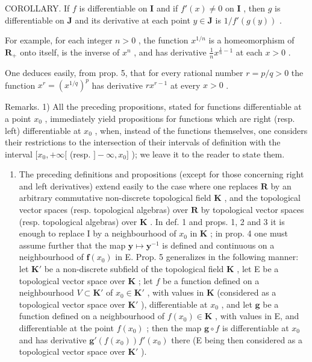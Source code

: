 COROLLARY. If \(f\) is differentiable on \(\mathbf{I}\) and if \(f'(x) \neq 0\) on \(\mathbf{I}\) , then \(g\) is differentiable on \(\mathbf{J}\) and its derivative at each point \(y \in \mathbf{J}\) is \(1 / f'(g(y))\) .

For example, for each integer \(n > 0\) , the function \(x^{1 / n}\) is a homeomorphism of \(\mathbf{R}_+\) onto itself, is the inverse of \(x^n\) , and has derivative \(\frac{1}{n} x^{\frac{1}{n} - 1}\) at each \(x > 0\) .

One deduces easily, from prop. 5, that for every rational number \(r = p / q > 0\) the function \(x^{r} = (x^{1 / q})^{p}\) has derivative \(rx^{r - 1}\) at every \(x > 0\) .

Remarks. 1) All the preceding propositions, stated for functions differentiable at a point \(x_0\) , immediately yield propositions for functions which are right (resp. left) differentiable at \(x_0\) , when, instead of the functions themselves, one considers their restrictions to the intersection of their intervals of definition with the interval \([x_0, +\infty[\) (resp. \(] - \infty, x_0]\) ); we leave it to the reader to state them.

\begin{enumerate}
\def\labelenumi{\arabic{enumi})}
\setcounter{enumi}{1}
\tightlist
\item
  The preceding definitions and propositions (except for those concerning right and left derivatives) extend easily to the case where one replaces \(\mathbf{R}\) by an arbitrary commutative non-discrete topological field \(\mathbf{K}\) , and the topological vector spaces (resp. topological algebras) over \(\mathbf{R}\) by topological vector spaces (resp. topological algebras) over \(\mathbf{K}\) . In def. 1 and props. 1, 2 and 3 it is enough to replace I by a neighbourhood of \(x_0\) in \(\mathbf{K}\) ; in prop. 4 one must assume further that the map \(\mathbf{y} \mapsto \mathbf{y}^{-1}\) is defined and continuous on a neighbourhood of \(\mathbf{f}(x_0)\) in E. Prop. 5 generalizes in the following manner: let \(\mathbf{K}'\) be a non-discrete subfield of the topological field \(\mathbf{K}\) , let E be a topological vector space over \(\mathbf{K}\) ; let \(f\) be a function defined on a neighbourhood \(V \subset \mathbf{K}'\) of \(x_0 \in \mathbf{K}'\) , with values in \(\mathbf{K}\) (considered as a topological vector space over \(\mathbf{K}'\) ), differentiable at \(x_0\) , and let \(\mathbf{g}\) be a function defined on a neighbourhood of \(f(x_0) \in \mathbf{K}\) , with values in E, and differentiable at the point \(f(x_0)\) ; then the map \(\mathbf{g} \circ f\) is differentiable at \(x_0\) and has derivative \(\mathbf{g}'(f(x_0))f'(x_0)\) there (E being then considered as a topological vector space over \(\mathbf{K}'\) ).
\end{enumerate}

